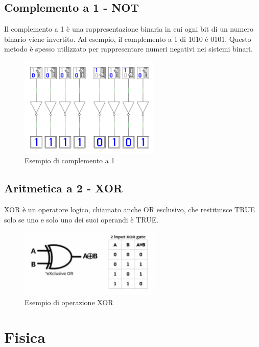\subsection{Complemento a 1 - NOT}
Il complemento a 1  è una rappresentazione binaria in cui ogni bit di un numero binario viene invertito. Ad esempio, il complemento a 1 di 1010 è 0101. Questo metodo è spesso utilizzato per rappresentare numeri negativi nei sistemi binari.
\begin{figure}[h!]
    \centering
    \includegraphics[width=0.6\textwidth]{images/complemento_uno}
    \caption{Esempio di complemento a 1}
    \label{fig:complemento_uno}
\end{figure}
\subsection{Aritmetica a 2 - XOR}
XOR è un operatore logico, chiamato anche OR esclusivo, che restituisce TRUE solo se uno e solo uno dei suoi operandi è TRUE.
\begin{figure}[h!]
    \centering
    \includegraphics[width=0.6\textwidth]{images/xor.png}
    \caption{Esempio di operazione XOR}
    \label{fig:xor_example}
\end{figure}



\newpage
\section{Fisica}
